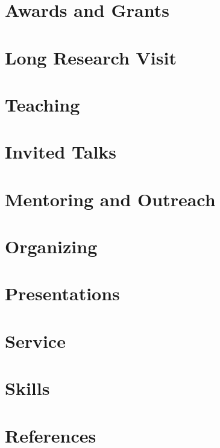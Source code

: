 \documentclass{prometheus_cv}
\begin{document}
\section{Awards and Grants}


\section{Long Research Visit}


\section{Teaching}


\section{Invited Talks}


\section{Mentoring and Outreach}


\section{Organizing}


\section{Presentations}


\section{Service}


\section{Skills}


\newpage

\section{References}

\end{document}
